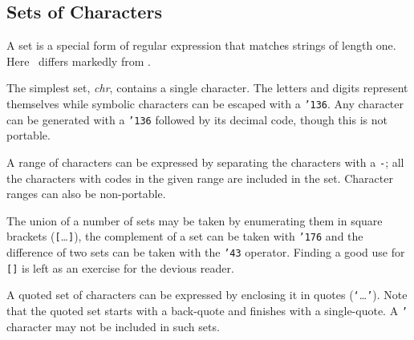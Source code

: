 \subsection{Sets of Characters}

A set is a special form of regular expression that matches strings of length
one.  Here \lx\ differs markedly from \lex.


The simplest set, {\it chr}, contains a single character.  The letters and
digits represent themselves while symbolic characters can be escaped with a
\mbox{\tt {\char'136}}.  Any character can be generated with a \mbox{\tt {\char'136}} followed by its decimal code,
though this is not portable.

A range of characters can be expressed by separating the characters with a
\mbox{\tt -}; all the characters with codes in the given range are included in
the set.  Character ranges can also be non-portable.

The union of a number of sets may be taken by enumerating them in square
brackets (\mbox{\tt [}\dots\mbox{\tt ]}), the complement of a set can be taken with \mbox{\tt {\char'176}} and the
difference of two sets can be taken with the \mbox{\tt {\char'43}} operator.  Finding a good use
for \mbox{\tt []} is left as an exercise for the devious reader.

A quoted set of characters can be expressed by enclosing it in quotes
(\mbox{\tt `}\dots\mbox{\tt '}).  Note that the quoted set starts with a back-quote and finishes
with a single-quote.  A \mbox{\tt '} character may not be included in such sets.


